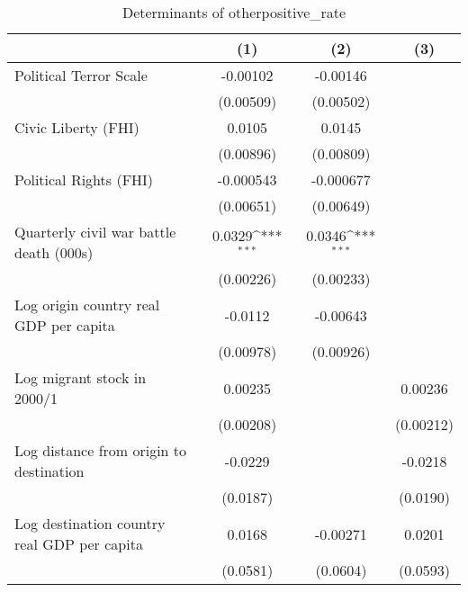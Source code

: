 \begin{table}[htbp]\centering
\def\sym#1{\ifmmode^{#1}\else\(^{#1}\)\fi}
\caption{Determinants of otherpositive\_rate}
\begin{tabular}{l*{3}{c}}
\hline\hline
                    &\multicolumn{1}{c}{(1)}         &\multicolumn{1}{c}{(2)}         &\multicolumn{1}{c}{(3)}         \\
\hline
Political Terror Scale&    -0.00102         &    -0.00146         &                     \\
                    &   (0.00509)         &   (0.00502)         &                     \\
[1em]
Civic Liberty (FHI) &      0.0105         &      0.0145         &                     \\
                    &   (0.00896)         &   (0.00809)         &                     \\
[1em]
Political Rights (FHI)&   -0.000543         &   -0.000677         &                     \\
                    &   (0.00651)         &   (0.00649)         &                     \\
[1em]
Quarterly civil war battle death (000s)&      0.0329\sym{***}&      0.0346\sym{***}&                     \\
                    &   (0.00226)         &   (0.00233)         &                     \\
[1em]
Log origin country real GDP per capita&     -0.0112         &    -0.00643         &                     \\
                    &   (0.00978)         &   (0.00926)         &                     \\
[1em]
Log migrant stock in 2000/1&     0.00235         &                     &     0.00236         \\
                    &   (0.00208)         &                     &   (0.00212)         \\
[1em]
Log distance from origin to destination&     -0.0229         &                     &     -0.0218         \\
                    &    (0.0187)         &                     &    (0.0190)         \\
[1em]
Log destination country real GDP per capita&      0.0168         &    -0.00271         &      0.0201         \\
                    &    (0.0581)         &    (0.0604)         &    (0.0593)         \\

\end{tabular}
\end{table}
